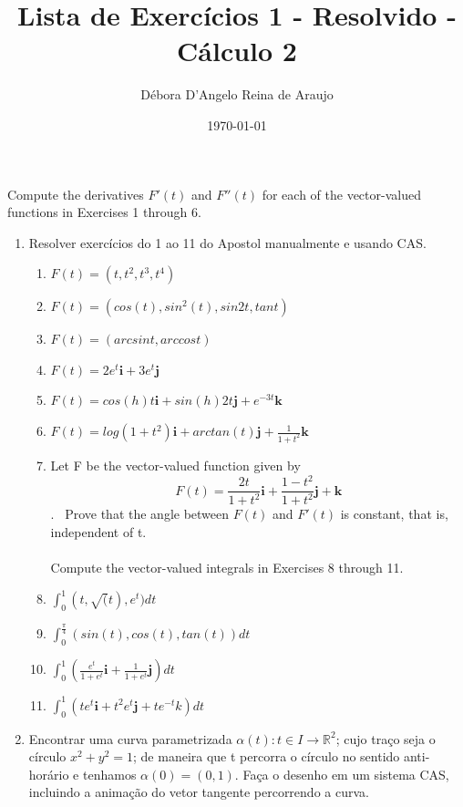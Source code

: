 \documentclass{article}
\begin{document}
\title{Lista de Exercícios 1 - Resolvido - Cálculo 2}
\author{Débora D'Angelo Reina de Araujo}
\date{\today}

\maketitle

Compute the derivatives $F'(t)$ and $F''(t)$ for each of the vector-valued functions in Exercises 1 through 6.

\begin{enumerate}
    \item Resolver exercícios do 1 ao 11 do Apostol manualmente e usando CAS.
        \begin{enumerate}[label=1.\arabic*.]
            \item $F(t) = (t, t^2, t^3, t^4)$ \
            \item $F(t) = (cos(t), sin^2(t), sin 2t, tan t)$ \
            \item $F(t) = (arcsin t, arccos t)$ \
            \item $F(t) = 2e^t\textbf{i} + 3e^t\textbf{j}$ \
            \item $F(t) = cos(h) t \textbf{i} + sin(h) 2t \textbf{j} + e^{-3t}\textbf{k}$ \
            \item $F(t) = log(1+t^2)\textbf{i} + arctan(t) \textbf{j} + \frac{1}{1+t^2}\textbf{k}$ \
            \item Let F be the vector-valued function given by \\
                $$F(t) = \frac{2t}{1+t^2}\textbf{i} + \frac{1-t^2}{1+t^2}\textbf{j} + \textbf{k}$$. \
                Prove that the angle between $F(t)$ and $F'(t)$ is constant, that is, independent of t. \\
                \\
            Compute the vector-valued integrals in Exercises 8 through 11. \
            \item $\int_{0}^{1} (t, \sqrt(t), e^t)dt$ \
            \item $\int_{0}^{\frac{\pi}{4}} (sin(t), cos(t), tan(t))dt$ \
            \item $\int_{0}^{1} (\frac{e^t}{1+e^t}\textbf{i} + \frac{1}{1+e^t}\textbf{j})dt$ \
            \item $\int_{0}^{1} (te^t\textbf{i} + t^2e^t\textbf{j} + te^{-t}k)dt$
        \end{enumerate}
    \item Encontrar uma curva parametrizada $\alpha(t) : t \in I \to \mathbb{R}^2$; cujo traço seja o círculo $x^2 + y^2 = 1$; de maneira que t percorra o círculo no sentido anti-horário e tenhamos $\alpha(0) = (0, 1)$. Faça o desenho em um sistema CAS, incluindo a animação do vetor tangente percorrendo a curva. \

\end{enumerate}
\end{document}
